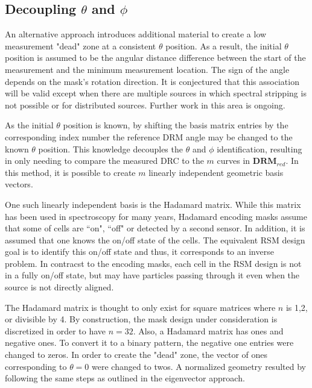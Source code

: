 \documentclass[3p,times]{elsarticle}
\begin{document}
\subsection{Decoupling $\theta$ and $\phi$}
An alternative approach introduces additional material to create a low measurement "dead" zone at a consistent $\theta$ position.  As a result, the initial $\theta$ position is assumed
to be the angular distance difference between the start of the measurement and the minimum measurement location.  The sign of the angle depends on the mask's rotation direction.  
It is conjectured that this association will be valid except when there are multiple sources in which spectral stripping is not possible 
or for distributed sources.  Further work in this area is ongoing.

As the initial $\theta$ position is known, by shifting the basis matrix entries by the corresponding index number the reference DRM angle may be changed to the known $\theta$ position.  
This knowledge decouples the $\theta$ and $\phi$ identification, resulting in only 
needing to compare the measured DRC to the $m$ curves in $\mathbf{DRM}_{red}$.  In this method, it is possible to create $m$ linearly independent geometric basis vectors.

One such linearly independent basis is the Hadamard matrix.  While this matrix has been used in spectroscopy for many years, Hadamard encoding masks assume that some of cells are ``on", ``off" or 
detected by a second sensor\cite{DeVerse00}.  In addition, it is assumed that one knows the on/off state of the cells.  The equivalent RSM design goal is to identify this on/off state and thus, 
it corresponds to an inverse problem.  In contracst to the encoding masks, each cell in the RSM design is not in a fully on/off state, but may have particles passing through it even when the source is not directly aligned.

The Hadamard matrix is thought to only exist for square matrices where $n$ is 1,2, or divisible by 4\cite{Sloane76}.  By construction, the mask design under consideration
is discretized in order to have $n=32$.  Also, a Hadamard matrix has ones and negative ones.  To convert it to a binary pattern, the negative one entries were changed to zeros.
In order to create the "dead" zone, the vector of ones corresponding to $\theta=0$ 
were changed to twos.  A normalized geometry resulted by following the same steps as outlined in the eigenvector approach.
\end{document}
